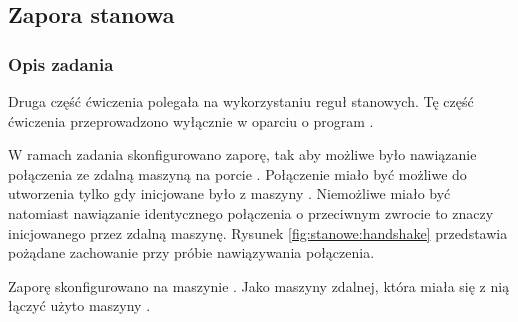 \subsection{Zapora stanowa}
\label{sec:stanowe}


\subsubsection{Opis zadania}

Druga część ćwiczenia polegała na wykorzystaniu reguł stanowych. Tę część
ćwiczenia przeprowadzono wyłącznie w oparciu o program \ipfw{}.

W ramach zadania skonfigurowano zaporę, tak aby możliwe było nawiązanie
połączenia ze zdalną maszyną na porcie \pos. Połączenie miało być możliwe do
utworzenia tylko gdy inicjowane było z maszyny \kdwa. Niemożliwe miało być
natomiast nawiązanie identycznego połączenia o przeciwnym zwrocie to znaczy
inicjowanego przez zdalną maszynę. Rysunek \ref{fig:stanowe:handshake}
przedstawia pożądane zachowanie przy próbie nawiązywania połączenia.

Zaporę skonfigurowano na maszynie \kdwa{}. Jako maszyny zdalnej, która miała
się z nią łączyć użyto maszyny \kpiec{}.






